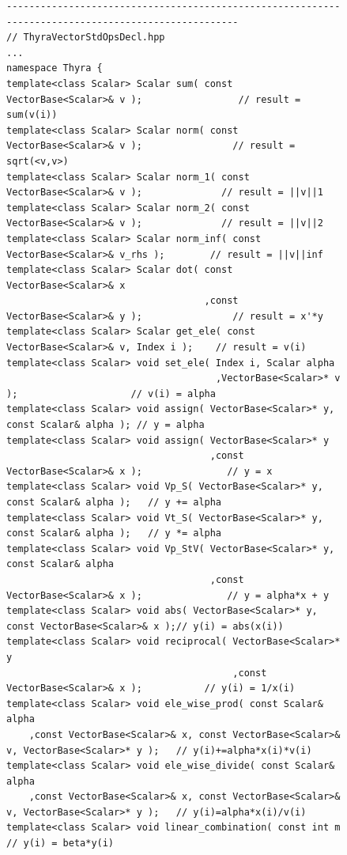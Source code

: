 \documentclass[pdf,ps2pdf,11pt]{SANDreport}
\begin{document}
{\bsinglespace
\begin{figure}[p]
\begin{minipage}{\textwidth}
{\scriptsize\begin{verbatim}
----------------------------------------------------------------------------------------------------
// ThyraVectorStdOpsDecl.hpp
...
namespace Thyra {
template<class Scalar> Scalar sum( const VectorBase<Scalar>& v );                 // result = sum(v(i))
template<class Scalar> Scalar norm( const VectorBase<Scalar>& v );                // result = sqrt(<v,v>)
template<class Scalar> Scalar norm_1( const VectorBase<Scalar>& v );              // result = ||v||1
template<class Scalar> Scalar norm_2( const VectorBase<Scalar>& v );              // result = ||v||2
template<class Scalar> Scalar norm_inf( const VectorBase<Scalar>& v_rhs );        // result = ||v||inf
template<class Scalar> Scalar dot( const VectorBase<Scalar>& x
                                   ,const VectorBase<Scalar>& y );                // result = x'*y
template<class Scalar> Scalar get_ele( const VectorBase<Scalar>& v, Index i );    // result = v(i)
template<class Scalar> void set_ele( Index i, Scalar alpha
                                     ,VectorBase<Scalar>* v );                    // v(i) = alpha
template<class Scalar> void assign( VectorBase<Scalar>* y, const Scalar& alpha ); // y = alpha
template<class Scalar> void assign( VectorBase<Scalar>* y
                                    ,const VectorBase<Scalar>& x );               // y = x
template<class Scalar> void Vp_S( VectorBase<Scalar>* y, const Scalar& alpha );   // y += alpha
template<class Scalar> void Vt_S( VectorBase<Scalar>* y, const Scalar& alpha );   // y *= alpha
template<class Scalar> void Vp_StV( VectorBase<Scalar>* y, const Scalar& alpha
                                    ,const VectorBase<Scalar>& x );               // y = alpha*x + y
template<class Scalar> void abs( VectorBase<Scalar>* y, const VectorBase<Scalar>& x );// y(i) = abs(x(i))
template<class Scalar> void reciprocal( VectorBase<Scalar>* y
                                        ,const VectorBase<Scalar>& x );           // y(i) = 1/x(i)
template<class Scalar> void ele_wise_prod( const Scalar& alpha
    ,const VectorBase<Scalar>& x, const VectorBase<Scalar>& v, VectorBase<Scalar>* y );   // y(i)+=alpha*x(i)*v(i)
template<class Scalar> void ele_wise_divide( const Scalar& alpha
    ,const VectorBase<Scalar>& x, const VectorBase<Scalar>& v, VectorBase<Scalar>* y );   // y(i)=alpha*x(i)/v(i)
template<class Scalar> void linear_combination( const int m                   // y(i) = beta*y(i)

\end{verbatim}}
\end{minipage}
\end{figure}}
\end{document}
